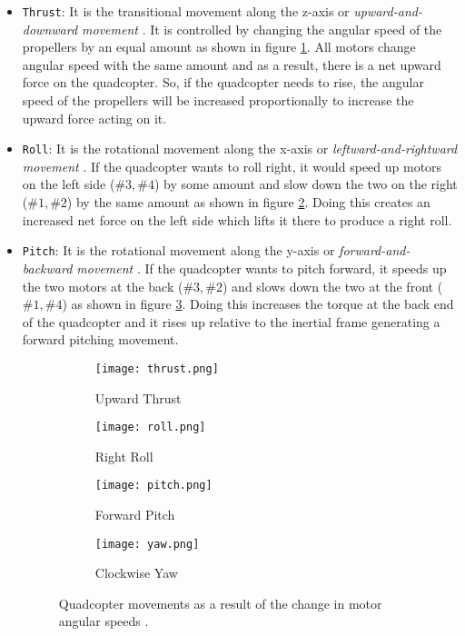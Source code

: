 \documentclass[10pt, a4paper]{article}
\newcommand{\code}[1]{\texttt{#1}}
\begin{document}
    \begin{itemize}
        \item \code{Thrust}: It is the transitional movement along the z-axis or \textit{upward-and-downward movement} \cite{book:quan2017-movements}. It is controlled by changing the angular speed of the propellers by an equal amount as shown in figure \ref{figure:Thrust}. All motors change angular speed with the same amount and as a result, there is a net upward force on the quadcopter. So, if the quadcopter needs to rise, the angular speed of the propellers will be increased proportionally to increase the upward force acting on it.
    
        \item \code{Roll}: It is the rotational movement along the x-axis or \textit{leftward-and-rightward movement} \cite{book:quan2017-movements}. If the quadcopter wants to roll right, it would speed up motors on the left side ($\#3, \#4$) by some amount and slow down the two on the right ($\#1, \#2$) by the same amount as shown in figure \ref{figure:roll}. Doing this creates an increased net force on the left side which lifts it there to produce a right roll.

        \item \code{Pitch}: It is the rotational movement along the y-axis or \textit{forward-and-backward movement} \cite{book:quan2017-movements}. If the quadcopter wants to pitch forward, it speeds up the two motors at the back ($\#3, \#2$) and slows down the two at the front ($\#1, \#4$) as shown in figure \ref{figure:pitch}. Doing this increases the torque at the back end of the quadcopter and it rises up relative to the inertial frame generating a forward pitching movement.
                
\begin{figure}[hbt!]
    \centering
    \begin{subfigure}[b]{0.41\textwidth}
        \centering
        \texttt{[image: thrust.png]}
        \caption{Upward Thrust}
        \label{figure:Thrust}
    \end{subfigure}
    \hfill
    \begin{subfigure}[b]{0.45\textwidth}
        \centering
        \texttt{[image: roll.png]}
        \caption{Right Roll}
        \label{figure:roll}        
    \end{subfigure}
    \hfill
    \begin{subfigure}[b]{0.45\textwidth}
        \centering
        \texttt{[image: pitch.png]}
        \caption{Forward Pitch}
        \label{figure:pitch}        
    \end{subfigure}
    \hfill
    \begin{subfigure}[b]{0.41\textwidth}
        \centering
        \texttt{[image: yaw.png]}
        \caption{Clockwise Yaw}
        \label{figure:yaw}        
    \end{subfigure}
    \caption{Quadcopter movements as a result of the change in motor angular speeds \cite{book:quan2017-movements}.}
    \label{figure:Movements}
\end{figure}


\end{itemize}
\end{document}
